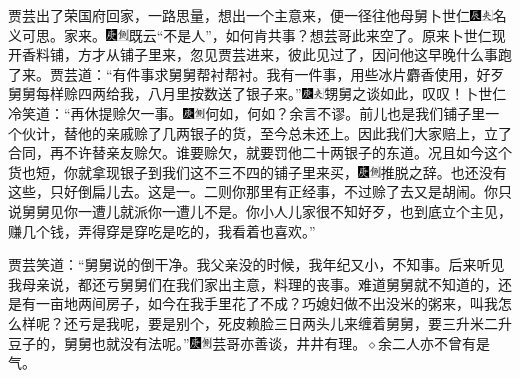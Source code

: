 贾芸出了荣国府回家，一路思量，想出一个主意来，便一径往他母舅卜世仁{\includegraphics[width=3mm]{../Images/00009}\includegraphics[width=3mm]{../Images/00012}\footnotesize \kaishu 名义可思。}家来。{\includegraphics[width=3mm]{../Images/00004}\includegraphics[width=3mm]{../Images/00011}\footnotesize \kaishu 既云“不是人”，如何肯共事？想芸哥此来空了。}原来卜世仁现开香料铺，方才从铺子里来，忽见贾芸进来，彼此见过了，因问他这早晚什么事跑了来。贾芸道：“有件事求舅舅帮衬帮衬。我有一件事，用些冰片麝香使用，好歹舅舅每样赊四两给我，八月里按数送了银子来。”{\includegraphics[width=3mm]{../Images/00004}\includegraphics[width=3mm]{../Images/00012}\footnotesize \kaishu 甥舅之谈如此，叹叹！}卜世仁冷笑道：“再休提赊欠一事。{\includegraphics[width=3mm]{../Images/00004}\includegraphics[width=3mm]{../Images/00011}\footnotesize \kaishu 何如，何如？余言不谬。}前儿也是我们铺子里一个伙计，替他的亲戚赊了几两银子的货，至今总未还上。因此我们大家赔上，立了合同，再不许替亲友赊欠。谁要赊欠，就要罚他二十两银子的东道。况且如今这个货也短，你就拿现银子到我们这不三不四的铺子里来买，{\includegraphics[width=3mm]{../Images/00004}\includegraphics[width=3mm]{../Images/00011}\footnotesize \kaishu 推脱之辞。}也还没有这些，只好倒扁儿去。这是一。二则你那里有正经事，不过赊了去又是胡闹。你只说舅舅见你一遭儿就派你一遭儿不是。你小人儿家很不知好歹，也到底立个主见，赚几个钱，弄得穿是穿吃是吃的，我看着也喜欢。”

贾芸笑道：“舅舅说的倒干净。我父亲没的时候，我年纪又小，不知事。后来听见我母亲说，都还亏舅舅们在我们家出主意，料理的丧事。难道舅舅就不知道的，还是有一亩地两间房子，如今在我手里花了不成？巧媳妇做不出没米的粥来，叫我怎么样呢？还亏是我呢，要是别个，死皮赖脸三日两头儿来缠着舅舅，要三升米二升豆子的，舅舅也就没有法呢。”{\includegraphics[width=3mm]{../Images/00004}\includegraphics[width=3mm]{../Images/00011}\footnotesize \kaishu 芸哥亦善谈，井井有理。{$\diamond$}余二人亦不曾有是气。}

